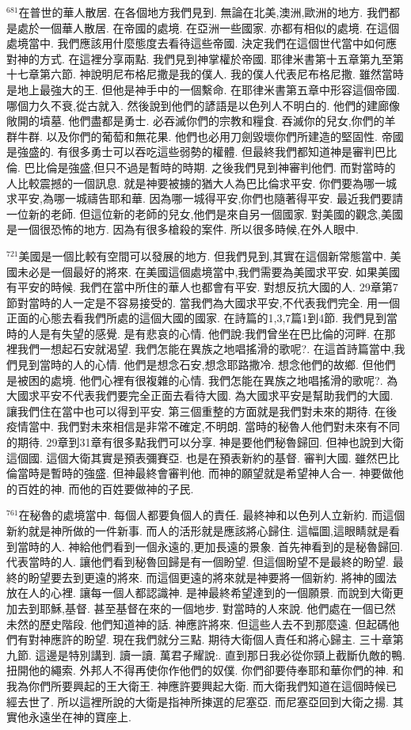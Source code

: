 \documentclass{book}
\begin{document}
$^{681}$在普世的華人散居.
在各個地方我們見到.
無論在北美,澳洲,歐洲的地方.
我們都是處於一個華人散居.
在帝國的處境.
在亞洲一些國家.
亦都有相似的處境.
在這個處境當中.
我們應該用什麼態度去看待這些帝國.
決定我們在這個世代當中如何應對神的方式.
在這裡分享兩點.
我們見到神掌權於帝國.
耶律米書第十五章第九至第十七章第六節.
神說明尼布格尼撒是我的僕人.
我的僕人代表尼布格尼撒.
雖然當時是地上最強大的王.
但他是神手中的一個繫命.
在耶律米書第五章中形容這個帝國.
哪個力久不衰,從古就入.
然後說到他們的諺語是以色列人不明白的.
他們的建廊像敞開的墳墓.
他們盡都是勇士.
必吞滅你們的宗教和糧食.
吞滅你的兒女,你們的羊群牛群.
以及你們的葡萄和無花果.
他們也必用刀劍毀壞你們所建造的堅固性.
帝國是強盛的.
有很多勇士可以吞吃這些弱勢的權體.
但最終我們都知道神是審判巴比倫.
巴比倫是強盛,但只不過是暫時的時期.
之後我們見到神審判他們.
而對當時的人比較震撼的一個訊息.
就是神要被擄的猶大人為巴比倫求平安.
你們要為哪一城求平安,為哪一城禱告耶和華.
因為哪一城得平安,你們也隨著得平安.
最近我們要請一位新的老師.
但這位新的老師的兒女,他們是來自另一個國家.
對美國的觀念,美國是一個很恐怖的地方.
因為有很多槍殺的案件.
所以很多時候,在外人眼中.

$^{721}$美國是一個比較有空間可以發展的地方.
但我們見到,其實在這個新常態當中.
美國未必是一個最好的將來.
在美國這個處境當中,我們需要為美國求平安.
如果美國有平安的時候.
我們在當中所住的華人也都會有平安.
對想反抗大國的人.
29章第7節對當時的人一定是不容易接受的.
當我們為大國求平安,不代表我們完全.
用一個正面的心態去看我們所處的這個大國的國家.
在詩篇的1,3,7篇1到4節.
我們見到當時的人是有失望的感覺.
是有悲哀的心情.
他們說:我們曾坐在巴比倫的河畔.
在那裡我們一想起石安就渴望.
我們怎能在異族之地唱搖滑的歌呢?.
在這首詩篇當中,我們見到當時的人的心情.
他們是想念石安,想念耶路撒冷.
想念他們的故鄉.
但他們是被困的處境.
他們心裡有很複雜的心情.
我們怎能在異族之地唱搖滑的歌呢?.
為大國求平安不代表我們要完全正面去看待大國.
為大國求平安是幫助我們的大國.
讓我們住在當中也可以得到平安.
第三個重整的方面就是我們對未來的期待.
在後疫情當中.
我們對未來相信是非常不確定,不明朗.
當時的秘魯人他們對未來有不同的期待.
29章到31章有很多點我們可以分享.
神是要他們秘魯歸回.
但神也說到大衛這個國.
這個大衛其實是預表彌賽亞.
也是在預表新約的基督.
審判大國.
雖然巴比倫當時是暫時的強盛.
但神最終會審判他.
而神的願望就是希望神人合一.
神要做他的百姓的神.
而他的百姓要做神的子民.

$^{761}$在秘魯的處境當中.
每個人都要負個人的責任.
最終神和以色列人立新約.
而這個新約就是神所做的一件新事.
而人的活形就是應該將心歸住.
這幅圖,這眼睛就是看到當時的人.
神給他們看到一個永遠的,更加長遠的景象.
首先神看到的是秘魯歸回.
代表當時的人.
讓他們看到秘魯回歸是有一個盼望.
但這個盼望不是最終的盼望.
最終的盼望要去到更遠的將來.
而這個更遠的將來就是神要將一個新約.
將神的國法放在人的心裡.
讓每一個人都認識神.
是神最終希望達到的一個願景.
而說到大衛更加去到耶穌,基督.
甚至基督在來的一個地步.
對當時的人來說.
他們處在一個已然未然的歷史階段.
他們知道神的話.
神應許將來.
但這些人去不到那麼遠.
但起碼他們有對神應許的盼望.
現在我們就分三點.
期待大衛個人責任和將心歸主.
三十章第九節.
這邊是特別講到.
讀一讀.
萬君子耀說:.
直到那日我必從你頸上截斷仇敵的鴨.
扭開他的繩索.
外邦人不得再使你作他們的奴僕.
你們卻要侍奉耶和華你們的神.
和我為你們所要興起的王大衛王.
神應許要興起大衛.
而大衛我們知道在這個時候已經去世了.
所以這裡所說的大衛是指神所揀選的尼塞亞.
而尼塞亞回到大衛之揚.
其實他永遠坐在神的寶座上.
\end{document}
